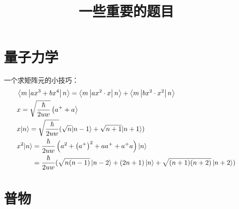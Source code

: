 \documentclass[UTF8]{article}
\title{一些重要的题目}
\author{}
\date{}
\begin{document}
\maketitle
\section{量子力学}
一个求矩阵元的小技巧：
\begin{align*}
    \begin{aligned}
         & \left\langle m\left|a x^3+b x^4\right| n\right\rangle=\left\langle m\left|a x^2 \cdot x\right| n\right\rangle+\left\langle m\left|b x^2 \cdot x^2\right| n\right\rangle \\
         & x=\sqrt{\frac{\hbar}{2 u w}}\left(a^{+}+a\right\rangle                                                                                                                  \\
         & x|n\rangle=\sqrt{\frac{\hbar}{2 u w}}(\sqrt{n}|n-1\rangle+\sqrt{n+1}|n+1\rangle)                                                                                        \\
         & \begin{aligned}
               x^2|n\rangle & =\frac{\hbar}{2 u w}\left(a^2+\left(a^{+}\right)^2+a a^{+}+a^{+} a\right)|n\rangle \\              
               & =\frac{\hbar}{2 u w}(\sqrt{n(n-1)}\ket{n-2}+(2n+1)\ket{n}
               +\sqrt{(n+1)(n+2)}\ket{n+2})
           \end{aligned}
    \end{aligned}
\end{align*}
\section{普物}
\end{document}
